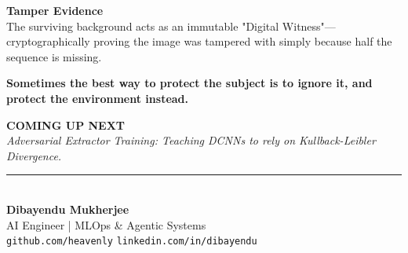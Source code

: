 \documentclass{article}
\begin{document}
\begin{darkbox}
{\Large \textbf{Tamper Evidence}}\\
The surviving background acts as an immutable "Digital Witness"—cryptographically proving the image was tampered with simply because half the sequence is missing.
\end{darkbox}
\newpage

\thispagestyle{empty}
\vspace*{3in}
\begin{center}
{\Huge \textbf{Sometimes the best way to protect the subject is to ignore it, and protect the environment instead.}}
\end{center}
\newpage

\thispagestyle{empty}
\vspace*{1in}
\begin{center}
{\Huge \textbf{COMING UP NEXT}}\\[0.3in]
{\Large \textit{Adversarial Extractor Training: Teaching DCNNs to rely on Kullback-Leibler Divergence.}}\\[2in]
\end{center}

\noindent\rule{\textwidth}{0.5pt}\\[0.2in]
{\Large \textbf{Dibayendu Mukherjee}}\\[0.1in]
{\large AI Engineer | MLOps \& Agentic Systems}\\[0.1in]
\faGithub \hspace{0.1in} \texttt{github.com/heavenly} \hspace{0.3in}
\faLinkedin \hspace{0.1in} \texttt{linkedin.com/in/dibayendu}
\end{document}

